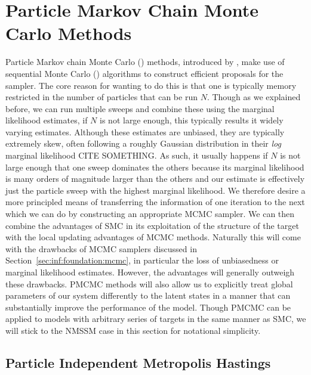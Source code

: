 
\section{Particle Markov Chain Monte Carlo Methods}
\label{sec:part:pmcmc}

Particle Markov chain Monte Carlo (\pmcmc) methods, introduced by \citet{andrieuDH2010}, make use of 
sequential Monte Carlo (\smc) algorithms \citep{gordon1993novel,doucet2001sequential} to construct 
efficient proposals for the \mcmc sampler. The core reason for wanting to do this is that
one is typically memory restricted in the number of particles that can be run $N$.  Though as we explained
before, we can run multiple sweeps and combine these using the marginal likelihood estimates, if $N$ is
not large enough, this typically results it widely varying estimates.  Although these estimates are unbiased,
they are typically extremely skew, often following a roughly Gaussian distribution in their \emph{log} marginal
likelihood CITE SOMETHING.  As such, it usually happens if $N$ is not large enough that one sweep dominates the others because
its marginal likelihood is many orders of magnitude larger than the others and our estimate is
effectively just the particle sweep with the highest marginal likelihood.  We therefore desire a more principled
means of transferring the information of one iteration to the next which we can do by constructing an appropriate MCMC
sampler.  We can then combine the advantages of SMC in its exploitation of the structure of the target with
the local updating advantages of MCMC methods.  Naturally this will come with the drawbacks of MCMC samplers
discussed in Section~\ref{sec:inf:foundation:mcmc}, in particular the loss of unbiasedness or marginal likelihood estimates.
However, the advantages will generally outweigh these drawbacks.  PMCMC methods will also allow us to explicitly
treat global parameters of our system differently to the latent states in a manner that can substantially improve
the performance of the model.
Though PMCMC can be applied to models with arbitrary series of targets in the same manner as SMC, we will stick
to the NMSSM case in this section for notational simplicity.

\subsection{Particle Independent Metropolis Hastings}
\label{sec:part:pmcmc:pimh}

